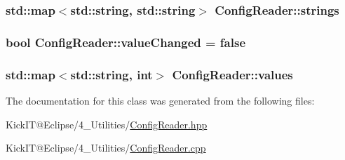\subsubsection[{\texorpdfstring{strings}{strings}}]{\setlength{\rightskip}{0pt plus 5cm}std\+::map$<$std\+::string, std\+::string$>$ Config\+Reader\+::strings\hspace{0.3cm}{\ttfamily [protected]}}\hypertarget{class_config_reader_ac03a3baf208f4dd2c2e5a8c9494b431b}{}\label{class_config_reader_ac03a3baf208f4dd2c2e5a8c9494b431b}
\subsubsection[{\texorpdfstring{value\+Changed}{valueChanged}}]{\setlength{\rightskip}{0pt plus 5cm}bool Config\+Reader\+::value\+Changed = false\hspace{0.3cm}{\ttfamily [protected]}}\hypertarget{class_config_reader_aa384495927b6c1677d39e34eac3e577c}{}\label{class_config_reader_aa384495927b6c1677d39e34eac3e577c}
\subsubsection[{\texorpdfstring{values}{values}}]{\setlength{\rightskip}{0pt plus 5cm}std\+::map$<$std\+::string, int$>$ Config\+Reader\+::values\hspace{0.3cm}{\ttfamily [protected]}}\hypertarget{class_config_reader_ad7bd3a0ec9513b9f385a658752c87b37}{}\label{class_config_reader_ad7bd3a0ec9513b9f385a658752c87b37}


The documentation for this class was generated from the following files\+:\begin{DoxyCompactItemize}
\item 
Kick\+I\+T@\+Eclipse/4\+\_\+\+Utilities/\hyperlink{_config_reader_8hpp}{Config\+Reader.\+hpp}\item 
Kick\+I\+T@\+Eclipse/4\+\_\+\+Utilities/\hyperlink{_config_reader_8cpp}{Config\+Reader.\+cpp}\end{DoxyCompactItemize}
